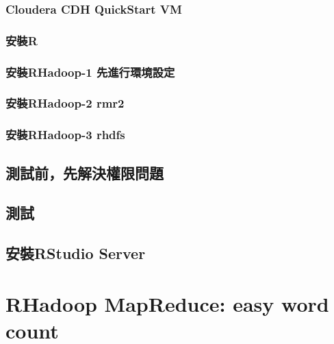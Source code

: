 \documentclass[]{book}
\begin{document}
\hypertarget{cloudera-cdh-quickstart-vm}{%
\subsubsection{Cloudera CDH QuickStart VM}\label{cloudera-cdh-quickstart-vm}}

\hypertarget{ux5b89ux88ddr}{%
\subsubsection{安裝R}\label{ux5b89ux88ddr}}

\hypertarget{ux5b89ux88ddrhadoop-1-ux5148ux9032ux884cux74b0ux5883ux8a2dux5b9a}{%
\subsubsection{安裝RHadoop-1 先進行環境設定}\label{ux5b89ux88ddrhadoop-1-ux5148ux9032ux884cux74b0ux5883ux8a2dux5b9a}}

\hypertarget{ux5b89ux88ddrhadoop-2-rmr2}{%
\subsubsection{安裝RHadoop-2 rmr2}\label{ux5b89ux88ddrhadoop-2-rmr2}}

\hypertarget{ux5b89ux88ddrhadoop-3-rhdfs}{%
\subsubsection{安裝RHadoop-3 rhdfs}\label{ux5b89ux88ddrhadoop-3-rhdfs}}

\hypertarget{ux6e2cux8a66ux524dux5148ux89e3ux6c7aux6b0aux9650ux554fux984c}{%
\subsection{測試前，先解決權限問題}\label{ux6e2cux8a66ux524dux5148ux89e3ux6c7aux6b0aux9650ux554fux984c}}

\hypertarget{ux6e2cux8a66}{%
\subsection{測試}\label{ux6e2cux8a66}}

\hypertarget{ux5b89ux88ddrstudio-server}{%
\subsection{安裝RStudio Server}\label{ux5b89ux88ddrstudio-server}}

\hypertarget{rhadoop-mapreduce-easy-word-count}{%
\section{RHadoop MapReduce: easy word count}\label{rhadoop-mapreduce-easy-word-count}}
\end{document}
